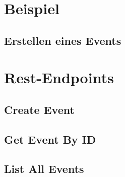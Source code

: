 \section{Beispiel}

\subsection{Erstellen eines Events}

\section{Rest-Endpoints}

\subsection{Create Event}

\subsection{Get Event By ID}
    
\subsection{List All Events}
    